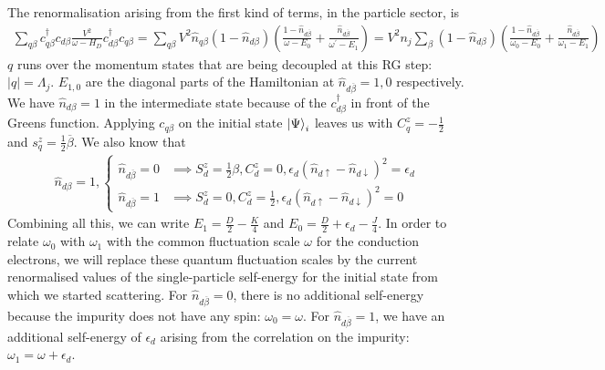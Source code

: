 \documentclass{report}
\numberwithin{equation}{section}
\begin{document}
\begin{appendices}
The renormalisation arising from the first kind of terms, in the particle sector, is
\begin{equation}\begin{aligned}
	\sum_{q\beta}c^\dagger_{q\beta}c_{d\beta}\frac{V^2}{\omega - H_D}c^\dagger_{d\beta}c_{q\beta} = \sum_{q\beta}V^2 \hat n_{q\beta} \left( 1 - \hat n_{d\beta} \right)\left( \frac{1-\hat n_{d \overline\beta }}{\omega - E_0} + \frac{\hat n_{d \overline\beta}}{\omega^\prime - E_1}\right) = V^2 n_j\sum_{\beta}\left( 1 - \hat n_{d\beta} \right)\left( \frac{1-\hat n_{d \overline\beta }}{\omega_0 - E_0} + \frac{\hat n_{d \overline\beta}}{\omega_1 - E_1}\right)
\end{aligned}\end{equation}
\(q\) runs over the momentum states that are being decoupled at this RG step: \(|q| = \Lambda_j\). \(E_{1,0}\) are the diagonal parts of the Hamiltonian at \(\hat n_{d\overline \beta}=1,0\) respectively. We have \(\hat n_{d\beta}=1\) in the intermediate state because of the \(c^\dagger_{d\beta}\) in front of the Greens function. Applying \(c_{q\beta}\) on the initial state \(\ket{\Psi}_i\) leaves us with \(C^z_q = - \frac{1}{2}\) and \(s^z_q = \frac{1}{2}\overline\beta\). We also know that
\begin{equation}\begin{aligned}
	\hat n_{d\beta}=1,
	\begin{cases}
		\hat n_{d\overline\beta}=0 &\implies S_d^z = \frac{1}{2}\beta, C_d^z = 0, \epsilon_d\left(\hat n_{d\uparrow} - \hat n_{d \downarrow}\right)^2 = \epsilon_d\\	
		\hat n_{d\overline\beta}=1 &\implies S_d^z = 0, C_d^z = \frac{1}{2}, \epsilon_d\left(\hat n_{d\uparrow} - \hat n_{d \downarrow}\right)^2 = 0
	\end{cases}
\end{aligned}\end{equation}
Combining all this, we can write \(E_1 = \frac{D}{2} - \frac{K}{4}\) and \(E_0 = \frac{D}{2} + \epsilon_d - \frac{J}{4}\). In order to relate \(\omega_0\) with \(\omega_1\) with the common fluctuation scale \(\omega\) for the conduction electrons, we will replace these quantum fluctuation scales by the current renormalised values of the single-particle self-energy for the initial state from which we started scattering. For \(\hat n_{d\overline\beta}=0\), there is no additional self-energy because the impurity does not have any spin: \(\omega_0 = \omega\). For \(\hat n_{d\overline\beta} = 1\), we have an additional self-energy of \(\epsilon_d\) arising from the correlation on the impurity: \(\omega_1 = \omega + \epsilon_d\).

\end{appendices}
\end{document}
